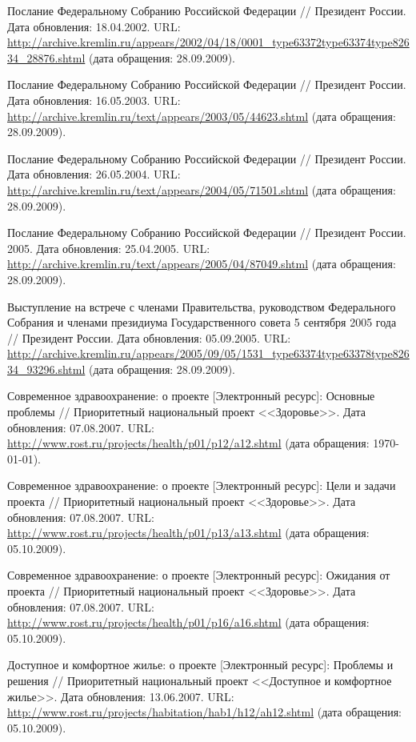 \begin{thebibliography}{99}
 Послание Федеральному Собранию Российской
  Федерации // Президент России. Дата обновления:
  18.04.2002. URL:
  \url{http://archive.kremlin.ru/appears/2002/04/18/0001_type63372type63374type82634_28876.shtml}
  (дата обращения: 28.09.2009).

 Послание Федеральному Собранию Российской
  Федерации // Президент России. Дата обновления:
  16.05.2003. URL:
  \url{http://archive.kremlin.ru/text/appears/2003/05/44623.shtml}
  (дата обращения: 28.09.2009).

 Послание Федеральному Собранию Российской
  Федерации // Президент России. Дата обновления:
  26.05.2004. URL:
  \url{http://archive.kremlin.ru/text/appears/2004/05/71501.shtml}
  (дата обращения: 28.09.2009).

 Послание Федеральному Собранию Российской
  Федерации // Президент России. 2005. Дата
  обновления: 25.04.2005. URL:
  \url{http://archive.kremlin.ru/text/appears/2005/04/87049.shtml}
  (дата обращения: 28.09.2009).

 Выступление на встрече с членами Правительства,
  руководством Федерального Собрания и членами президиума
  Государственного совета 5 сентября 2005 года //
  Президент России. Дата обновления: 05.09.2005. URL:
  \url{http://archive.kremlin.ru/appears/2005/09/05/1531_type63374type63378type82634_93296.shtml}
  (дата обращения: 28.09.2009).

 Современное здравоохранение: о проекте
  [Электронный ресурс]: Основные проблемы // Приоритетный национальный
  проект <<Здоровье>>. Дата обновления: 07.08.2007. URL:
  \url{http://www.rost.ru/projects/health/p01/p12/a12.shtml} (дата
  обращения: \today).

 Современное здравоохранение: о проекте
  [Электронный ресурс]: Цели и задачи проекта // Приоритетный
  национальный проект <<Здоровье>>. Дата обновления: 07.08.2007. URL:
  \url{http://www.rost.ru/projects/health/p01/p13/a13.shtml} (дата
  обращения: 05.10.2009).

 Современное здравоохранение: о проекте
  [Электронный ресурс]: Ожидания от проекта // Приоритетный
  национальный проект <<Здоровье>>. Дата обновления: 07.08.2007. URL:
  \url{http://www.rost.ru/projects/health/p01/p16/a16.shtml} (дата
  обращения: 05.10.2009).

 Доступное и комфортное жилье: о проекте
  [Электронный ресурс]: Проблемы и решения // Приоритетный
  национальный проект <<Доступное и комфортное жилье>>. Дата
  обновления: 13.06.2007. URL:
  \url{http://www.rost.ru/projects/habitation/hab1/h12/ah12.shtml}
  (дата обращения: 05.10.2009).


\end{thebibliography}
